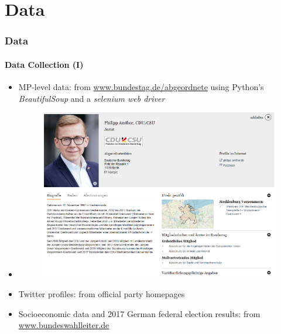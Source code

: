 \documentclass[xcolor=dvipsnames]{beamer}
\begin{document}
\section{Data}
\begin{frame}
\frametitle{Data}
\framesubtitle{Data Collection (I)}
\begin{itemize}
\item MP-level data: from \url{www.bundestag.de/abgeordnete} using Python's \textit{BeautifulSoup} and a \textit{selenium web driver} \cite{van1995python} \cite{richardson2007beautiful}
\item[] 
	\begin{figure}[h!]
  	\centering
  	\includegraphics[scale = 0.30]{../plots/presentation/amthor.png}
	\end{figure}
\item Twitter profiles: from official party homepages
\item Socioeconomic data and 2017 German federal election results: from \url{www.bundeswahlleiter.de}
\end{itemize}
\end{frame}
\end{document}

